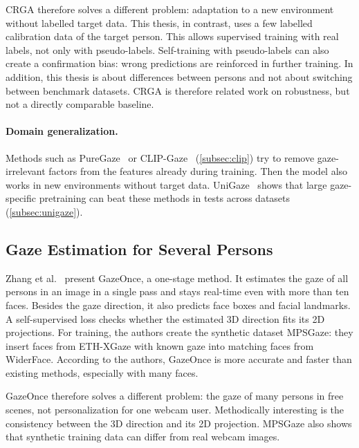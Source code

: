 CRGA therefore solves a different problem: adaptation to a new environment
without labelled target data. This thesis, in contrast, uses a few labelled
calibration data of the target person. This allows supervised training with
real labels, not only with pseudo-labels. Self-training with pseudo-labels can
also create a confirmation bias: wrong predictions are reinforced in further
training. In addition, this thesis is about differences between persons and
not about switching between benchmark datasets. CRGA is therefore related work
on robustness, but not a directly comparable baseline.

\paragraph{Domain generalization.}
Methods such as PureGaze~\cite{cheng2022puregaze} or
CLIP-Gaze~\cite{yin2024clipgaze} (\cref{subsec:clip}) try to remove
gaze-irrelevant factors from the features already during training. Then the
model also works in new environments without target data.
UniGaze~\cite{qin2026unigaze} shows that large gaze-specific pretraining can
beat these methods in tests across datasets (\cref{subsec:unigaze}).

\subsection{Gaze Estimation for Several Persons}
\label{subsec:gazeonce}
Zhang et al.~\cite{zhang2022gazeonce} present GazeOnce, a one-stage method. It
estimates the gaze of all persons in an image in a single pass and stays
real-time even with more than ten faces. Besides the gaze direction, it also
predicts face boxes and facial landmarks. A self-supervised loss checks whether
the estimated 3D direction fits its 2D projections. For training, the authors
create the synthetic dataset MPSGaze: they insert faces from ETH-XGaze with
known gaze into matching faces from WiderFace. According to the authors,
GazeOnce is more accurate and faster than existing methods, especially with
many faces.

GazeOnce therefore solves a different problem: the gaze of many persons in
free scenes, not personalization for one webcam user. Methodically interesting
is the consistency between the 3D direction and its 2D projection. MPSGaze also
shows that synthetic training data can differ from real webcam images.

